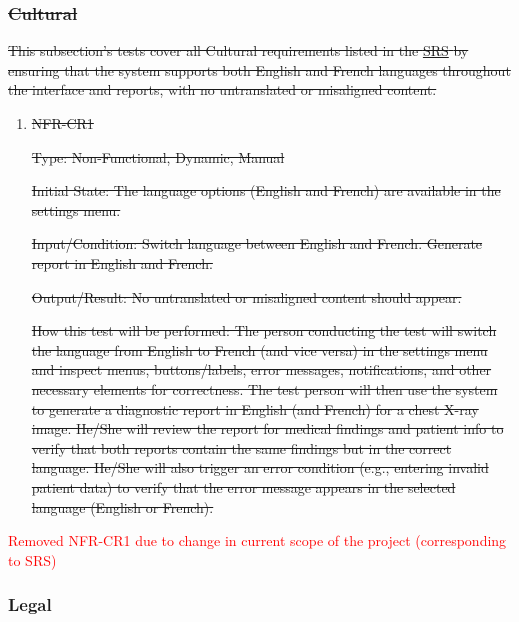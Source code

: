 \documentclass[12pt, titlepage]{article}
\begin{document}
\begin{enumerate}
\begin{enumerate}
\begin{enumerate}
\begin{enumerate}
\begin{enumerate}
\end{enumerate}

\subsubsection{\sout{Cultural}}

\sout{This subsection's tests cover all Cultural requirements listed in the \href{https://github.com/RezaJodeiri/CXR-Capstone/blob/main/docs/SRS/SRS.pdf}{SRS} \citep{SRS}
 by ensuring that the system supports both English and French languages throughout the interface and reports, with no untranslated or misaligned content.}

\begin{enumerate}

\item{\sout{NFR-CR1}\\}\label{NFR-CR1}

\sout{Type: Non-Functional, Dynamic, Manual}

\sout{Initial State: The language options (English and French) are available in the settings menu.}

\sout{Input/Condition: Switch language between English and French. Generate report in English and French.}

\sout{Output/Result: No untranslated or misaligned content should appear.}

\sout{How this test will be performed: The person conducting the test will switch the language from English to French (and vice versa) in the settings menu and inspect menus, buttons/labels, error messages, notifications, and other necessary elements for correctness. The test person will then use the system to generate a diagnostic report in English (and French) for a chest X-ray image. He/She will review the report for medical findings and patient info to verify that both reports contain the same findings but in the correct language. He/She will also trigger an error condition (e.g., entering invalid patient data) to verify that the error message appears in the selected language (English or French).}

\end{enumerate}

\textcolor{red}{Removed NFR-CR1 due to change in current scope of the project (corresponding to SRS)}

\subsubsection{Legal}


\end{enumerate}
\end{enumerate}
\end{enumerate}
\end{enumerate}
\end{document}
